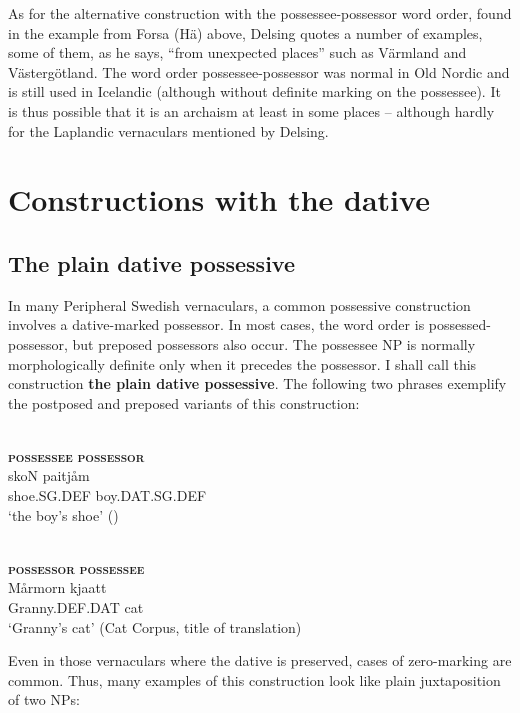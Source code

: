 As for the alternative construction with the possessee-possessor word order, found in the example from Forsa (Hä) above, Delsing quotes a number of examples, some of them, as he says, “from unexpected places” such as Värmland and Västergötland. The word order possessee-possessor was normal in Old Nordic and is still used in Icelandic (although without definite marking on the possessee). It is thus possible that it is an archaism at least in some places – although hardly for the Laplandic vernaculars mentioned by Delsing.

\section{Constructions with the dative}
\label{bkm:Ref136427895}\subsection{The plain dative possessive}

In many Peripheral Swedish vernaculars, a common possessive construction involves a dative-marked possessor. In most cases, the word order is possessed-possessor, but preposed possessors also occur. The possessee NP is normally morphologically definite only when it precedes the possessor. I shall call this construction \textbf{the plain dative possessive}. The following two phrases exemplify the postposed and preposed variants of this construction:

\renewcommand{\eachwordone}{\scshape}
\renewcommand{\eachwordtwo}{\itshape}

\ea\label{}
	\\
	\glll \textbf{\textsc{possessee}} \textbf{\textsc{possessor}} \\
	skoN  paitjåm  \\
	shoe.SG.DEF  boy.DAT.SG.DEF  \\
	\glt ‘the boy’s shoe’ (\citet[22]{Marklund1976})
\z

\ea\label{}
	\\
	\glll \textbf{\textsc{possessor}} \textbf{\textsc{possessee}} \\
	Mårmorn  kjaatt\\
	Granny.DEF.DAT  cat\\
\glt ‘Granny’s cat’ (Cat Corpus, title of translation)
\z

Even in those vernaculars where the dative is preserved, cases of zero-marking are common. Thus, many examples of this construction look like plain juxtaposition of two NPs:

